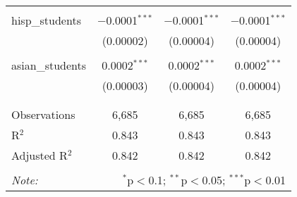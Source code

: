 \begin{table}[!htbp]
\begin{tabular}{@{\extracolsep{-2pt}}lccc}
  & & & \\ 
 hisp\_students & $-$0.0001$^{***}$ & $-$0.0001$^{***}$ & $-$0.0001$^{***}$ \\ 
  & (0.00002) & (0.00004) & (0.00004) \\ 
  & & & \\ 
 asian\_students & 0.0002$^{***}$ & 0.0002$^{***}$ & 0.0002$^{***}$ \\ 
  & (0.00003) & (0.00004) & (0.00004) \\ 
  & & & \\ 
\hline \\[-1.8ex] 
Observations & 6,685 & 6,685 & 6,685 \\ 
R$^{2}$ & 0.843 & 0.843 & 0.843 \\ 
Adjusted R$^{2}$ & 0.842 & 0.842 & 0.842 \\ 
\hline 
\hline \\[-1.8ex] 
\textit{Note:}  & \multicolumn{3}{r}{$^{*}$p$<$0.1; $^{**}$p$<$0.05; $^{***}$p$<$0.01} \\ 
\end{tabular} 
\end{table} 
